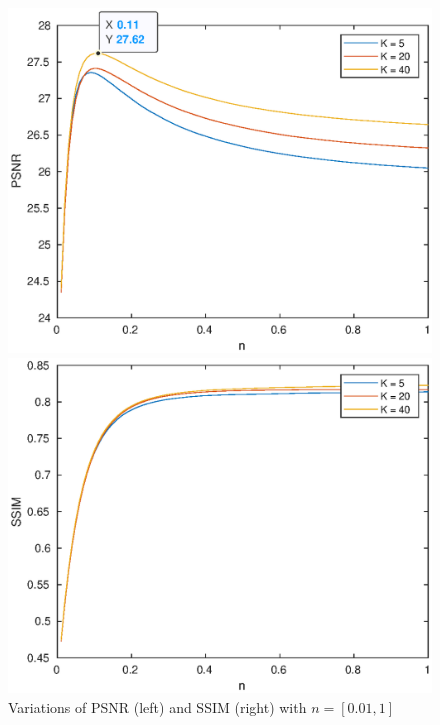 \documentclass[12pt,a4paper]{article}
\begin{document}
\begin{figure}[h]
    \begin{minipage}[t]{.5\textwidth}
      \centerline{\includegraphics[scale=0.5]{times_beta_k_psnr.eps}}
    \end{minipage}
   \begin{minipage}[t]{.5\textwidth}
      \centerline{\includegraphics[scale=0.5]{times_beta_k_ssim.eps}}
    \end{minipage}
    \caption{Variations of PSNR (left) and SSIM (right) with $n = [0.01,1]$}
    \label{fig:op beta for k}
\end{figure}
\end{document}
